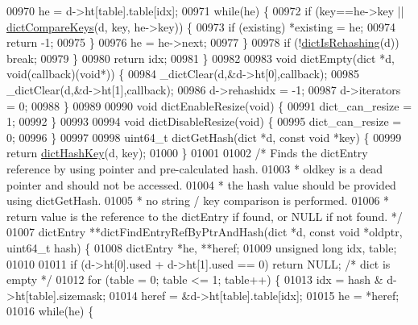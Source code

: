 \begin{DoxyCode}
00970         he = d->ht[table].table[idx];
00971         \textcolor{keywordflow}{while}(he) \{
00972             \textcolor{keywordflow}{if} (key==he->key || \hyperlink{dict_8h_ab373389c580b8441ab28082cb7643762}{dictCompareKeys}(d, key, he->key)) \{
00973                 \textcolor{keywordflow}{if} (existing) *existing = he;
00974                 \textcolor{keywordflow}{return} -1;
00975             \}
00976             he = he->next;
00977         \}
00978         \textcolor{keywordflow}{if} (!\hyperlink{dict_8h_aa6e4917a6a32fdf47180e03ed8969e02}{dictIsRehashing}(d)) \textcolor{keywordflow}{break};
00979     \}
00980     \textcolor{keywordflow}{return} idx;
00981 \}
00982 
00983 \textcolor{keywordtype}{void} dictEmpty(dict *d, \textcolor{keywordtype}{void}(callback)(\textcolor{keywordtype}{void}*)) \{
00984     \_dictClear(d,&d->ht[0],callback);
00985     \_dictClear(d,&d->ht[1],callback);
00986     d->rehashidx = -1;
00987     d->iterators = 0;
00988 \}
00989 
00990 \textcolor{keywordtype}{void} dictEnableResize(\textcolor{keywordtype}{void}) \{
00991     dict\_can\_resize = 1;
00992 \}
00993 
00994 \textcolor{keywordtype}{void} dictDisableResize(\textcolor{keywordtype}{void}) \{
00995     dict\_can\_resize = 0;
00996 \}
00997 
00998 uint64\_t dictGetHash(dict *d, \textcolor{keyword}{const} \textcolor{keywordtype}{void} *key) \{
00999     \textcolor{keywordflow}{return} \hyperlink{dict_8h_a15a270e95a4eea30557df137e9747a95}{dictHashKey}(d, key);
01000 \}
01001 
01002 \textcolor{comment}{/* Finds the dictEntry reference by using pointer and pre-calculated hash.}
01003 \textcolor{comment}{ * oldkey is a dead pointer and should not be accessed.}
01004 \textcolor{comment}{ * the hash value should be provided using dictGetHash.}
01005 \textcolor{comment}{ * no string / key comparison is performed.}
01006 \textcolor{comment}{ * return value is the reference to the dictEntry if found, or NULL if not found. */}
01007 dictEntry **dictFindEntryRefByPtrAndHash(dict *d, \textcolor{keyword}{const} \textcolor{keywordtype}{void} *oldptr, uint64\_t hash) \{
01008     dictEntry *he, **heref;
01009     \textcolor{keywordtype}{unsigned} \textcolor{keywordtype}{long} idx, table;
01010 
01011     \textcolor{keywordflow}{if} (d->ht[0].used + d->ht[1].used == 0) \textcolor{keywordflow}{return} NULL; \textcolor{comment}{/* dict is empty */}
01012     \textcolor{keywordflow}{for} (table = 0; table <= 1; table++) \{
01013         idx = hash & d->ht[table].sizemask;
01014         heref = &d->ht[table].table[idx];
01015         he = *heref;
01016         \textcolor{keywordflow}{while}(he) \{

\end{DoxyCode}
